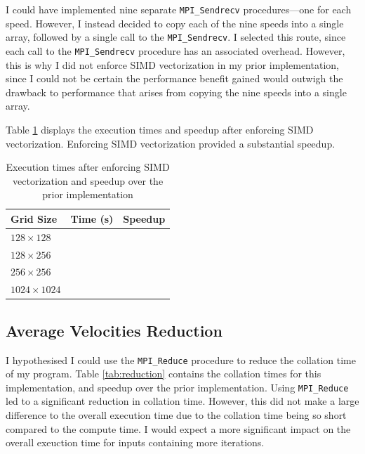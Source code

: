 \documentclass[twocolumn, a4paper]{article}
\begin{document}
I could have implemented nine separate \texttt{MPI\_Sendrecv} procedures---one for each speed.
However, I instead decided to copy each of the nine speeds into a single array, followed by a single call to the \texttt{MPI\_Sendrecv}.
I selected this route, since each call to the \texttt{MPI\_Sendrecv} procedure has an associated overhead.
However, this is why I did not enforce SIMD vectorization in my prior implementation, since I could not be certain the performance benefit gained would outwigh the drawback to performance that arises from copying the nine speeds into a single array.

Table \ref{tab:simd} displays the execution times and speedup after enforcing SIMD vectorization.
Enforcing SIMD vectorization provided a substantial speedup.

\begin{table}[htbp]
  \begin{center}
  \caption{Execution times after enforcing SIMD vectorization and speedup over the prior implementation}\label{tab:simd}
  \begin{tabular}[t]{l | l l} 
      \hline\hline
      Grid Size&Time (s)&Speedup\\
      \hline
      $128 \times 128$&\texttt{}&\texttt{}\\
      $128 \times 256$&\texttt{}&\texttt{}\\
      $256 \times 256$&\texttt{}&\texttt{}\\
      $1024 \times 1024$&\texttt{}&\texttt{}\\
      \hline
    \end{tabular}
  \end{center}
\end{table}

\subsection{Average Velocities Reduction}

I hypothesised I could use the \texttt{MPI\_Reduce} procedure to reduce the collation time of my program.
Table \ref{tab:reduction} contains the collation times for this implementation, and speedup over the prior implementation.
Using \texttt{MPI\_Reduce} led to a significant reduction in collation time.
However, this did not make a large difference to the overall execution time due to the collation time being so short compared to the compute time.
I would expect a more significant impact on the overall exeuction time for inputs containing more iterations.
\end{document}
